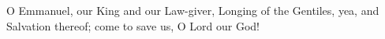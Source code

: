  O Emmanuel, our King and our Law-giver, Longing of the Gentiles, yea, and Salvation thereof; come to save us, O Lord our God! 